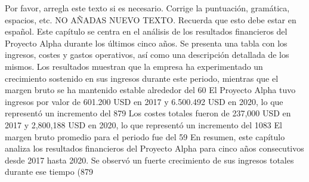 Por favor, arregla este texto si es necesario. Corrige la puntuación, gramática, espacios, etc. NO AÑADAS NUEVO TEXTO. Recuerda que esto debe estar en español.
Este capítulo se centra en el análisis de los resultados financieros del Proyecto Alpha durante los últimos cinco años. Se presenta una tabla con los ingresos, costes y gastos operativos, así como una descripción detallada de los mismos. Los resultados muestran que la empresa ha experimentado un crecimiento sostenido en sus ingresos durante este periodo, mientras que el margen bruto se ha mantenido estable alrededor del 60%
El Proyecto Alpha tuvo ingresos por valor de 601.200 USD en 2017 y 6.500.492 USD en 2020, lo que representó un incremento del 879%
Los costes totales fueron de 237,000 USD en 2017 y 2,800,188 USD en 2020, lo que representó un incremento del 1083%
El margen bruto promedio para el periodo fue del 59%
En resumen, este capítulo analiza los resultados financieros del Proyecto Alpha para cinco años consecutivos desde 2017 hasta 2020. Se observó un fuerte crecimiento de sus ingresos totales durante ese tiempo (879%
